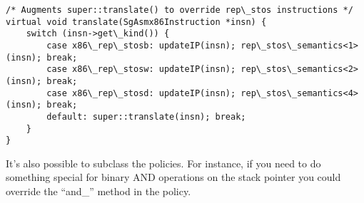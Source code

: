 \begin{verbatim}
/* Augments super::translate() to override rep\_stos instructions */
virtual void translate(SgAsmx86Instruction *insn) {
    switch (insn->get\_kind()) {
        case x86\_rep\_stosb: updateIP(insn); rep\_stos\_semantics<1>(insn); break;
        case x86\_rep\_stosw: updateIP(insn); rep\_stos\_semantics<2>(insn); break;
        case x86\_rep\_stosd: updateIP(insn); rep\_stos\_semantics<4>(insn); break;
        default: super::translate(insn); break;
    }
}
\end{verbatim}

It's also possible to subclass the policies. For instance, if you need
to do something special for binary AND operations on the stack
pointer you could override the ``and_'' method in the policy.
